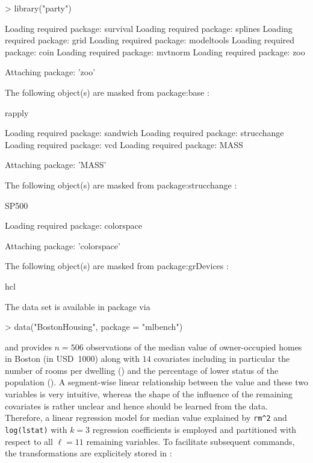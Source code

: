 \documentclass{Z}
\begin{document}
\begin{Schunk}
\begin{Sinput}
> library("party")
\end{Sinput}
\begin{Soutput}
Loading required package: survival
Loading required package: splines
Loading required package: grid
Loading required package: modeltools
Loading required package: coin
Loading required package: mvtnorm
Loading required package: zoo

Attaching package: 'zoo'


	The following object(s) are masked from package:base :

	 rapply 

Loading required package: sandwich
Loading required package: strucchange
Loading required package: vcd
Loading required package: MASS

Attaching package: 'MASS'


	The following object(s) are masked from package:strucchange :

	 SP500 

Loading required package: colorspace

Attaching package: 'colorspace'


	The following object(s) are masked from package:grDevices :

	 hcl 
\end{Soutput}
\end{Schunk}

The data set is available in package  via

\begin{Schunk}
\begin{Sinput}
> data("BostonHousing", package = "mlbench")
\end{Sinput}
\end{Schunk}

and provides $n = 506$ observations of the median value of owner-occupied
homes in Boston (in USD~1000) along with $14$ covariates including in particular
the number of rooms per dwelling () and the percentage
of lower status of the population (). A segment-wise linear relationship between
the value and these two variables is very intuitive, whereas the shape of the influence
of the remaining covariates is rather unclear and hence should be learned from the data.
Therefore, a linear regression model for median value explained by \verb:rm^2:
and \verb:log(lstat): with $k = 3$ regression coefficients is employed and
partitioned with respect to all $\ell = 11$ remaining variables. To facilitate subsequent
commands, the transformations are explicitely stored in :
\end{document}
